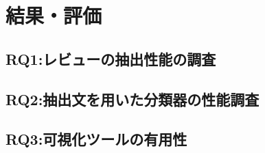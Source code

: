 \chapter{結果・評価}
\label{chap:kekkahyouka}

\section{RQ1:レビューの抽出性能の調査}


\section{RQ2:抽出文を用いた分類器の性能調査}


\section{RQ3:可視化ツールの有用性}